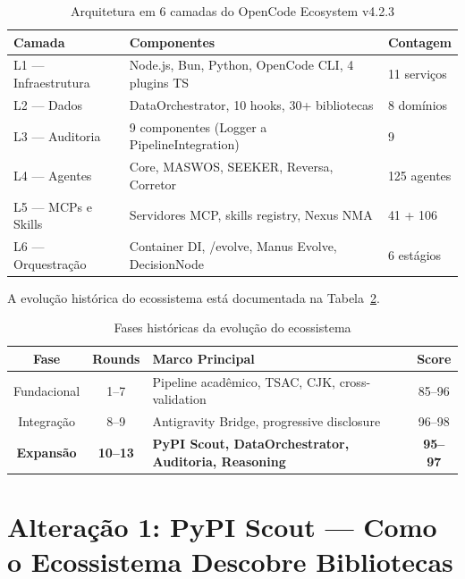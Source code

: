 \documentclass[12pt,a4paper]{article}
\begin{document}
\begin{table}[H]
  \centering
  \caption{Arquitetura em 6 camadas do OpenCode Ecosystem v4.2.3}
  \label{tab:layers}
  \begin{tabular}{l l l}
    \toprule
    \textbf{Camada} & \textbf{Componentes} & \textbf{Contagem} \\
    \midrule
    L1 --- Infraestrutura  & Node.js, Bun, Python, OpenCode CLI, 4 plugins TS & 11 serviços \\
    L2 --- Dados           & DataOrchestrator, 10 hooks, 30+ bibliotecas       & 8 domínios \\
    L3 --- Auditoria       & 9 componentes (Logger a PipelineIntegration)       & 9 \\
    L4 --- Agentes         & Core, MASWOS, SEEKER, Reversa, Corretor           & 125 agentes \\
    L5 --- MCPs e Skills   & Servidores MCP, skills registry, Nexus NMA          & 41 + 106 \\
    L6 --- Orquestração    & Container DI, /evolve, Manus Evolve, DecisionNode   & 6 estágios \\
    \bottomrule
  \end{tabular}
\end{table}

A evolução histórica do ecossistema está documentada na Tabela~\ref{tab:history}.

\begin{table}[H]
  \centering
  \caption{Fases históricas da evolução do ecossistema}
  \label{tab:history}
  \begin{tabular}{c c l c}
    \toprule
    \textbf{Fase} & \textbf{Rounds} & \textbf{Marco Principal} & \textbf{Score} \\
    \midrule
    Fundacional    & 1--7   & Pipeline acadêmico, TSAC, CJK, cross-validation  & 85--96 \\
    Integração     & 8--9   & Antigravity Bridge, progressive disclosure        & 96--98 \\
    \textbf{Expansão} & \textbf{10--13} & \textbf{PyPI Scout, DataOrchestrator, Auditoria, Reasoning} & \textbf{95--97} \\
    \bottomrule
  \end{tabular}
\end{table}

\section{Alteração 1: PyPI Scout --- Como o Ecossistema Descobre Bibliotecas}
\end{document}
